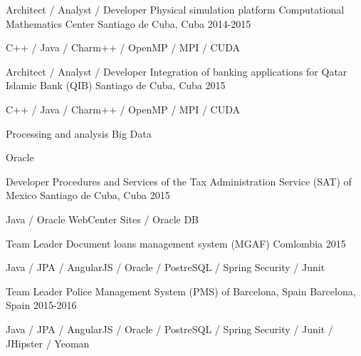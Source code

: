 \begin{cventries}
\cventry
{Architect / Analyst / Developer} %
{Physical simulation platform Computational Mathematics Center} %
{Santiago de Cuba, Cuba} %
{2014-2015} %
{ %
\begin{cvitems}
\item {C++ / Java / Charm++ / OpenMP / MPI / CUDA}
\end{cvitems}
}


\cventry
{Architect / Analyst / Developer} %
{Integration of banking applications for Qatar Islamic Bank (QIB)} %
{Santiago de Cuba, Cuba} %
{2015} %
{ %
\begin{cvitems}
\item {C++ / Java / Charm++ / OpenMP / MPI / CUDA}
\item {Processing and analysis Big Data}
\item {Oracle}
\end{cvitems}
}


\cventry
{Developer} %
{Procedures and Services of the Tax Administration Service (SAT) of Mexico} %
{Santiago de Cuba, Cuba} %
{2015} %
{ %
\begin{cvitems}
\item {Java / Oracle WebCenter Sites / Oracle DB}
\end{cvitems}
}

\cventry
{Team Leader} %
{Document loans management system (MGAF)} %
{Comlombia} %
{2015} %
{ %
\begin{cvitems}
\item {Java / JPA / AngularJS / Oracle / PostreSQL / Spring Security / Junit}
\end{cvitems}
}

\cventry
{Team Leader} %
{Police Management System (PMS) of Barcelona, Spain} %
{Barcelona, Spain} %
{2015-2016} %
{ %
\begin{cvitems}
\item {Java / JPA / AngularJS / Oracle / PostreSQL / Spring Security / Junit / JHipster / Yeoman}
\end{cvitems}
}


\end{cventries}


